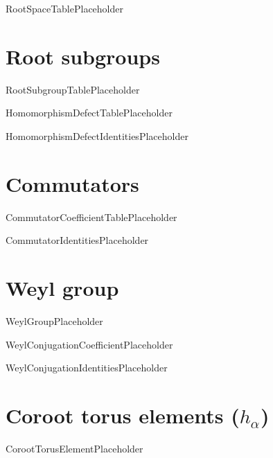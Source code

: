 \documentclass[11pt]{article}
\theoremstyle{definition}
\begin{document}
RootSpaceTablePlaceholder

\section{Root subgroups}

RootSubgroupTablePlaceholder

HomomorphismDefectTablePlaceholder

HomomorphismDefectIdentitiesPlaceholder

\section{Commutators}

CommutatorCoefficientTablePlaceholder

CommutatorIdentitiesPlaceholder

\section{Weyl group}

WeylGroupPlaceholder

WeylConjugationCoefficientPlaceholder

WeylConjugationIdentitiesPlaceholder

\section{Coroot torus elements ($h_\alpha$)}

CorootTorusElementPlaceholder
\end{document}

